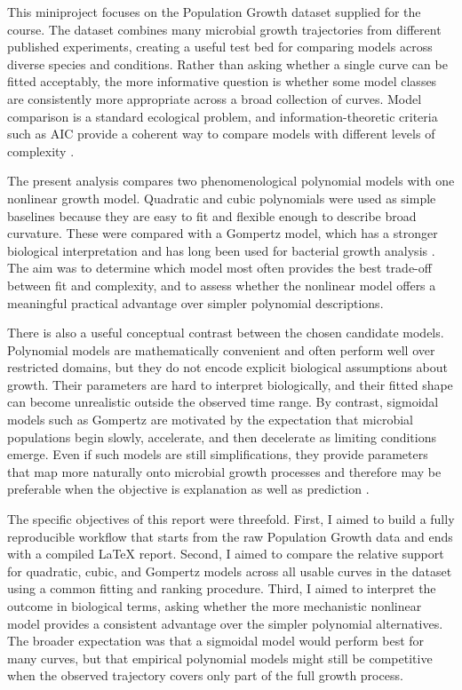 \documentclass[11pt]{article}
\begin{document}
This miniproject focuses on the Population Growth dataset supplied for the course. The dataset combines many microbial growth trajectories from different published experiments, creating a useful test bed for comparing models across diverse species and conditions. Rather than asking whether a single curve can be fitted acceptably, the more informative question is whether some model classes are consistently more appropriate across a broad collection of curves. Model comparison is a standard ecological problem, and information-theoretic criteria such as AIC provide a coherent way to compare models with different levels of complexity \citep{Johnson2004}.

The present analysis compares two phenomenological polynomial models with one nonlinear growth model. Quadratic and cubic polynomials were used as simple baselines because they are easy to fit and flexible enough to describe broad curvature. These were compared with a Gompertz model, which has a stronger biological interpretation and has long been used for bacterial growth analysis \citep{Zwietering1990}. The aim was to determine which model most often provides the best trade-off between fit and complexity, and to assess whether the nonlinear model offers a meaningful practical advantage over simpler polynomial descriptions.

There is also a useful conceptual contrast between the chosen candidate models. Polynomial models are mathematically convenient and often perform well over restricted domains, but they do not encode explicit biological assumptions about growth. Their parameters are hard to interpret biologically, and their fitted shape can become unrealistic outside the observed time range. By contrast, sigmoidal models such as Gompertz are motivated by the expectation that microbial populations begin slowly, accelerate, and then decelerate as limiting conditions emerge. Even if such models are still simplifications, they provide parameters that map more naturally onto microbial growth processes and therefore may be preferable when the objective is explanation as well as prediction \citep{Baranyi1994,Zwietering1990}.

The specific objectives of this report were threefold. First, I aimed to build a fully reproducible workflow that starts from the raw Population Growth data and ends with a compiled \LaTeX{} report. Second, I aimed to compare the relative support for quadratic, cubic, and Gompertz models across all usable curves in the dataset using a common fitting and ranking procedure. Third, I aimed to interpret the outcome in biological terms, asking whether the more mechanistic nonlinear model provides a consistent advantage over the simpler polynomial alternatives. The broader expectation was that a sigmoidal model would perform best for many curves, but that empirical polynomial models might still be competitive when the observed trajectory covers only part of the full growth process.
\end{document}
